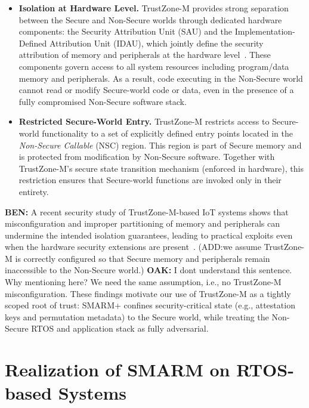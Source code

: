\documentclass{ieeeaccess}
\DeclareRobustCommand{\oak}[1]{{\color{OAKcolor}\textbf{OAK:} #1}}
\DeclareRobustCommand{\ben}[1]{{\color{BENcolor}\textbf{BEN:} #1}}
\newcommand{\rtsmarm}{SMARM+\xspace}
\begin{document}
\begin{itemize}
    \item \textbf{Isolation at Hardware Level.}
    TrustZone-M provides strong separation between the Secure and Non-Secure worlds through dedicated hardware components: the Security Attribution Unit (SAU) and the Implementation-Defined Attribution Unit (IDAU), which jointly define the security attribution of memory and peripherals at the hardware level~\cite{arm-trustzone-cm}.
    These components govern access to all system resources including program/data memory and peripherals.
    As a result, code executing in the Non-Secure world cannot read or modify Secure-world code or data, even in the presence of a fully compromised Non-Secure software stack.

    \item \textbf{Restricted Secure-World Entry.}
    TrustZone-M restricts access to Secure-world functionality to a set of explicitly defined entry points located in the \emph{Non-Secure Callable} (NSC) region.
    This region is part of Secure memory and is protected from modification by Non-Secure software.
    Together with TrustZone-M's secure state transition mechanism (enforced in hardware), this restriction ensures that Secure-world functions are invoked only in their entirety.
\end{itemize}



\ben{A recent security study of TrustZone-M-based IoT systems shows that misconfiguration and improper partitioning of memory and peripherals can undermine the intended isolation guarantees, leading to practical exploits even when the hardware security extensions are present~\cite{tzm-sec-iot}. (ADD:we assume TrustZone-M is correctly configured so that Secure memory and peripherals remain inaccessible to the Non-Secure world.)}
\oak{I dont understand this sentence. Why mentioning here? We need the same assumption, i.e., no TrustZone-M misconfiguration.}
These findings motivate our use of TrustZone-M as a tightly scoped root of trust: \rtsmarm confines security-critical state (e.g., attestation keys and permutation
metadata) to the Secure world, while treating the Non-Secure RTOS and application stack as fully adversarial.

\section{Realization of SMARM on RTOS-based Systems}
\label{sec:porting}
\end{document}
